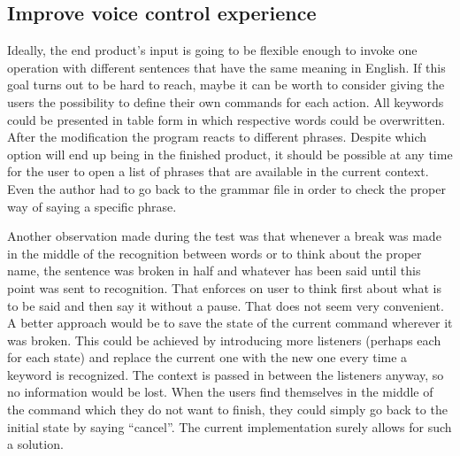 \subsection{Improve voice control experience}
Ideally, the end product's input is going to be flexible enough to invoke one operation with different sentences that have the same meaning in English. If this goal turns out to be hard to reach, maybe it can be worth to consider giving the users the possibility to define their own commands for each action. All keywords could be presented in table form in which respective words could be overwritten. After the modification the program reacts to different phrases.
Despite which option will end up being in the finished product, it should be possible at any time for the user to open a list of phrases that are available in the current context. Even the author had to go back to the grammar file in order to check the proper way of saying a specific phrase. 

Another observation made during the test was that whenever a break was made in the middle of the recognition \eg between words or to think about the proper name, the sentence was broken in half and whatever has been said until this point was sent to recognition. That enforces on user to think first about what is to be said and then say it without a pause. That does not seem very convenient. A better approach would be to save the state of the current command wherever it was broken. This could be achieved by introducing more listeners (perhaps each for each state) and replace the current one with the new one every time a keyword is recognized. The context is passed in between the listeners anyway, so no information would be lost. When the users find themselves in the middle of the command which they do not want to finish, they could simply go back to the initial state by saying ``cancel''. The current implementation surely allows for such a solution.

